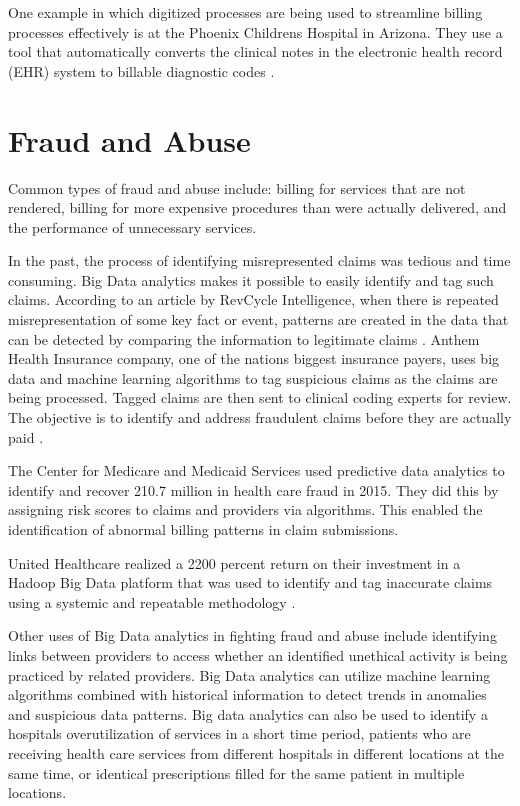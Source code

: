 \documentclass[sigconf]{acmart}
\begin{document}
One example in which digitized processes are being used to streamline billing processes effectively is at the Phoenix Childrens Hospital in Arizona.  They use a tool that automatically converts the clinical notes in the electronic health record (EHR) system to billable diagnostic codes \cite{www-google-admin}. 

\section{Fraud and Abuse}

Common types of fraud and abuse include: billing for services that are not rendered, billing for more expensive procedures than were actually delivered, and the performance of unnecessary services. 

In the past, the process of identifying misrepresented claims was tedious and time consuming.  Big Data analytics makes it possible to easily identify and tag such claims.  According to an article by RevCycle Intelligence, when there is repeated misrepresentation of some key fact or event, patterns are created in the data that can be detected by comparing the information to legitimate claims \cite{www-google-datameer}.  Anthem Health Insurance company, one of the nations biggest insurance payers, uses big data and machine learning algorithms to tag suspicious claims as the claims are being processed.  Tagged claims are then sent to clinical coding experts for review. The objective is to identify and address fraudulent claims before they are actually paid \cite{www-google-datameer}.

The Center for Medicare and Medicaid Services used predictive data analytics to identify and recover 210.7 million in health care fraud in 2015. They did this by assigning risk scores to claims and providers via algorithms. This enabled the identification of abnormal billing patterns in claim submissions.  

United Healthcare realized a 2200 percent return on their investment in a Hadoop Big Data platform that was used to identify and tag inaccurate claims using a systemic and repeatable methodology \cite{www-google-McDonald}.

Other uses of Big Data analytics in fighting fraud and abuse include identifying links between providers to access whether an identified unethical activity is being practiced by related providers.  Big Data analytics can utilize machine learning algorithms combined with historical information to detect trends in anomalies and suspicious data patterns. Big data analytics can also be used to identify a hospitals overutilization of services in a short time period, patients who are receiving health care services from different hospitals in different locations at the same time, or identical prescriptions filled for the same patient in multiple locations. 
\end{document}

